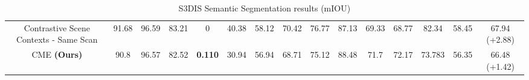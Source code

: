 \documentclass[10pt,twocolumn,letterpaper]{article}
\begin{document}
\begin{table}[t!]
{\begin{tabular}{ c | c c c c c c c c c c c c c | c }
            Contrastive Scene Contexts - Same Scan & 91.68          & 96.59          & 83.21          & 0              & 40.38          & 58.12          & 70.42          & 76.77          & 87.13          & 69.33          & 68.77          & 82.34          & 58.45          & 67.94 (+2.88)          \\
            CME \textbf{(Ours)}                    & 90.8           & 96.57          & 82.52          & \textbf{0.110} & 30.94          & 56.94          & 68.71          & 75.12          & 88.48          & 71.7           & 72.17          & 73.783         & 56.35          & 66.48 (+1.42)          \\
        \end{tabular}
    }
    \caption{S3DIS Semantic Segmentation results (mIOU)}
    \label{table:s3disResults}
\end{table}
\end{document}
